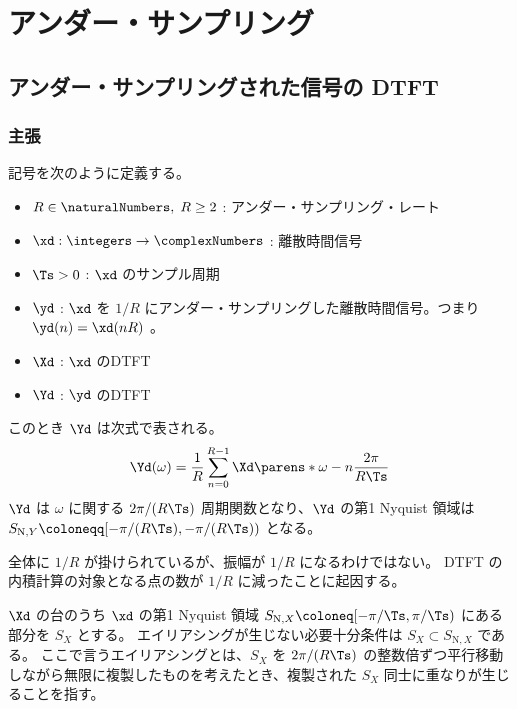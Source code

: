 \chapter{アンダー・サンプリング}
    \section{アンダー・サンプリングされた信号の DTFT}
        \label{アンダー・サンプリングされた信号の DTFT}
        \subsection{主張}
            記号を次のように定義する。
            \begin{itemize}
                \item $R\in\naturalNumbers,\;R\geq 2$ : アンダー・サンプリング・レート
                \item $\xd:\integers\to\complexNumbers$ : 離散時間信号
                \item $\Ts>0$ : $\xd$ のサンプル周期
                \item $\yd$ : $\xd$ を $1/R$ にアンダー・サンプリングした離散時間信号。つまり $\yd(n) = \xd(nR)$ 。
                \item $\Xd$ : $\xd$ のDTFT
                \item $\Yd$ : $\yd$ のDTFT
            \end{itemize}
            このとき $\Yd$ は次式で表される。
            \[ \Yd(\omega) = \frac{1}{R}\sum_{n=0}^{R-1} \Xd\parens*{\omega-n\frac{2\pi}{R\Ts}} \]
            $\Yd$ は $\omega$ に関する $2\pi/(R\Ts)$ 周期関数となり、$\Yd$ の第1 Nyquist 領域は $S_{\text{N},Y} \coloneqq [-\pi/(R\Ts),-\pi/(R\Ts))$ となる。
            \par
            全体に $1/R$ が掛けられているが、振幅が $1/R$ になるわけではない。
            DTFT の内積計算の対象となる点の数が $1/R$ に減ったことに起因する。
            \par
            $\Xd$ の台のうち $\xd$ の第1 Nyquist 領域 $S_{\text{N},X} \coloneq [-\pi/\Ts, \pi/\Ts)$ にある部分を $S_X$ とする。
            エイリアシングが生じない必要十分条件は $S_X\subset S_{\text{N},X}$ である。
            ここで言うエイリアシングとは、$S_X$ を $2\pi/(R\Ts)$ の整数倍ずつ平行移動しながら無限に複製したものを考えたとき、複製された $S_X$ 同士に重なりが生じることを指す。
